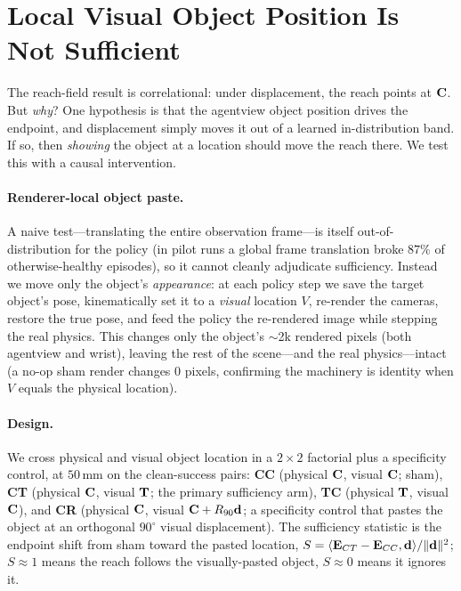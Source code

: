 \section{Local Visual Object Position Is Not Sufficient}
\label{sec:sufficiency}

The reach-field result is correlational: under displacement, the reach points at $\mathbf{C}$. But \emph{why}? One hypothesis is that the agentview object position drives the endpoint, and displacement simply moves it out of a learned in-distribution band. If so, then \emph{showing} the object at a location should move the reach there. We test this with a causal intervention.

\paragraph{Renderer-local object paste.} A naive test---translating the entire observation frame---is itself out-of-distribution for the policy (in pilot runs a global frame translation broke $87\%$ of otherwise-healthy episodes), so it cannot cleanly adjudicate sufficiency. Instead we move only the object's \emph{appearance}: at each policy step we save the target object's pose, kinematically set it to a \emph{visual} location $V$, re-render the cameras, restore the true pose, and feed the policy the re-rendered image while stepping the real physics. This changes only the object's $\sim$2k rendered pixels (both agentview and wrist), leaving the rest of the scene---and the real physics---intact (a no-op sham render changes $0$ pixels, confirming the machinery is identity when $V$ equals the physical location).

\paragraph{Design.} We cross physical and visual object location in a $2{\times}2$ factorial plus a specificity control, at $50$\,mm on the clean-success pairs: \textbf{CC} (physical $\mathbf{C}$, visual $\mathbf{C}$; sham), \textbf{CT} (physical $\mathbf{C}$, visual $\mathbf{T}$; the primary sufficiency arm), \textbf{TC} (physical $\mathbf{T}$, visual $\mathbf{C}$), and \textbf{CR} (physical $\mathbf{C}$, visual $\mathbf{C}+R_{90}\mathbf{d}$; a specificity control that pastes the object at an orthogonal $90^\circ$ visual displacement). The sufficiency statistic is the endpoint shift from sham toward the pasted location, $S=\langle\mathbf{E}_{CT}-\mathbf{E}_{CC},\mathbf{d}\rangle/\lVert\mathbf{d}\rVert^2$; $S\!\approx\!1$ means the reach follows the visually-pasted object, $S\!\approx\!0$ means it ignores it.

